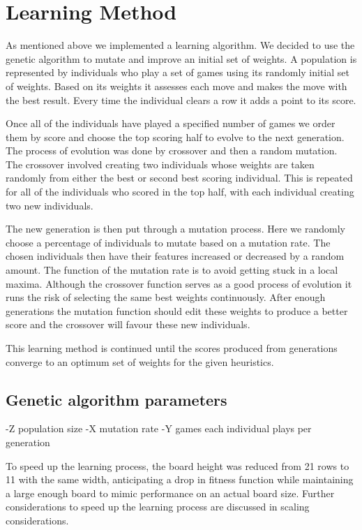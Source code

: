 \documentclass[10pt]{report}
\begin{document}
\section{Learning Method}
As mentioned above we implemented a learning algorithm. We decided to use the genetic algorithm to mutate and improve an initial set of weights. A population is represented by individuals who play a set of games using its randomly initial set of weights. Based on its weights it assesses each move and makes the move with the best result. Every time the individual clears a row it adds a point to its score. 

Once all of the individuals have played a specified number of games we order them by score and choose the top scoring half to evolve to the next generation. The process of evolution was done by crossover and then a random mutation. The crossover involved creating two individuals whose weights are taken randomly from either the best or second best scoring individual. This is repeated for all of the individuals who scored in the top half, with each individual creating two new individuals. 

The new generation is then put through a mutation process. Here we randomly choose a percentage of individuals to mutate based on a mutation rate. The chosen individuals then have their features increased or decreased by a random amount. The function of the mutation rate is to avoid getting stuck in a local maxima. Although the crossover function serves as a good process of evolution it runs the risk of selecting the same best weights continuously. After enough generations the mutation function should edit these weights to produce a better score and the crossover will favour these new individuals.

This learning method is continued until the scores produced from generations converge to an optimum set of weights for the given heuristics.

\subsection{Genetic algorithm parameters}
-Z population size
-X mutation rate
-Y games each individual plays per generation

To speed up the learning process, the board height was reduced from 21 rows to 11 with the same width, anticipating a drop in fitness function while maintaining a large enough board to mimic performance on an actual board size. Further considerations to speed up the learning process are discussed in scaling considerations.
\end{document}
